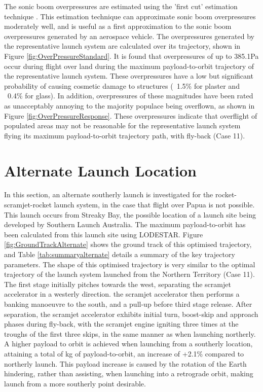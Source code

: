 The sonic boom overpressures are estimated using the 'first cut' estimation technique \cite{Carlson1972}. This estimation technique can approximate sonic boom overpressures moderately well, and is useful as a first approximation to the sonic boom overpressures generated by an aerospace vehicle. The overpressures generated by the representative launch system are calculated over its trajectory, shown in Figure \ref{fig:OverPressureStandard}. It is found that overpressures of up to 385.1Pa occur during flight over land during the maximum payload-to-orbit trajectory of the representative launch system. These overpressures have a low but significant probability of causing cosmetic damage to structures (~1.5\% for plaster and ~0.4\% for glass)\cite{Hershey1976}. In addition, overpressures of these magnitudes have been rated as unacceptably annoying to the majority populace being overflown, as shown in Figure \ref{fig:OverPressureResponse}. 
These overpressures indicate that overflight of populated areas may not be reasonable for the representative launch system flying its maximum payload-to-orbit trajectory path, with fly-back (Case 11). 







\section{Alternate Launch Location}

In this section, an alternate southerly launch is investigated for the rocket-scramjet-rocket launch system, in the case that flight over Papua is not possible. This launch occurs from Streaky Bay, the possible location of a launch site being developed by Southern Launch Australia\cite{Council2016}. The maximum payload-to-orbit has been calculated from this launch site using LODESTAR. Figure \ref{fig:GroundTrackAlternate} shows the ground track of this optimised trajectory, and Table \ref{tab:summaryalternate} details a summary of the key trajectory parameters. The shape of this optimised trajectory is very similar to the optimal trajectory of the launch system launched from the Northern Territory (Case 11). The first stage initially pitches towards the west, separating the scramjet accelerator in a westerly direction. the scramjet accelerator then performs a banking manoeuvre to the south, and a pull-up before third stage release. After separation, the scramjet accelerator exhibits initial turn, boost-skip and approach phases during fly-back, with the scramjet engine igniting three times at the troughs of the first three skips, in the same manner as when launching northerly. A higher payload to orbit is achieved when launching from a southerly location, attaining a total of \PayloadToOrbitAlternate kg of payload-to-orbit, an increase of +2.1\% compared to northerly launch. This payload increase is caused by the rotation of the Earth hindering, rather than assisting, when launching into a retrograde orbit, making launch from a more southerly point desirable. 


